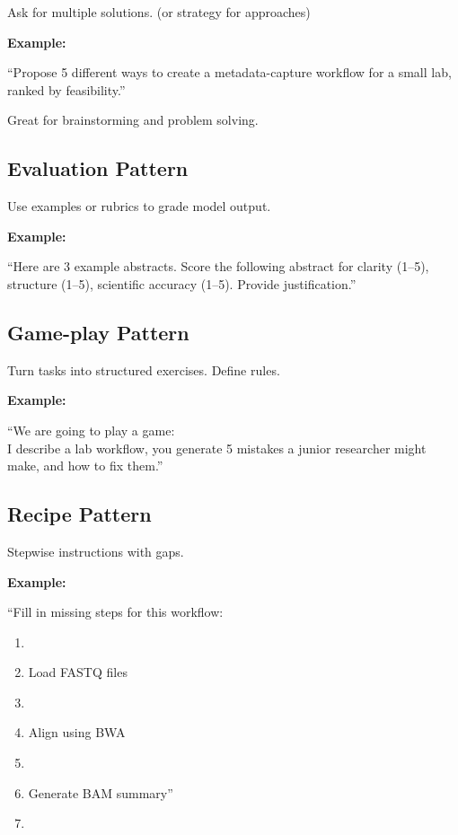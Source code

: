 \documentclass[
  letterpaper,
  DIV=11,
  numbers=noendperiod]{scrreprt}
\begin{document}
Ask for multiple solutions. (or strategy for approaches)

\textbf{Example:}

``Propose 5 different ways to create a metadata-capture workflow for a
small lab, ranked by feasibility.''

Great for brainstorming and problem solving.

\subsection{Evaluation Pattern}\label{evaluation-pattern}

Use examples or rubrics to grade model output.

\textbf{Example:}

``Here are 3 example abstracts. Score the following abstract for clarity
(1--5), structure (1--5), scientific accuracy (1--5). Provide
justification.''

\subsection{Game-play Pattern}\label{game-play-pattern}

Turn tasks into structured exercises. Define rules.

\textbf{Example:}

``We are going to play a game:\\
I describe a lab workflow, you generate 5 mistakes a junior researcher
might make, and how to fix them.''

\subsection{Recipe Pattern}\label{recipe-pattern}

Stepwise instructions with gaps.

\textbf{Example:}

``Fill in missing steps for this workflow:

\begin{enumerate}
\def\labelenumi{\arabic{enumi}.}
\item
\item
  Load FASTQ files
\item
\item
  Align using BWA
\item
\item
  Generate BAM summary''
\item
\end{enumerate}
\end{document}
